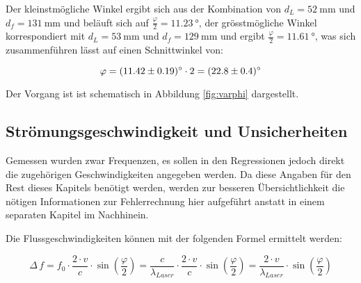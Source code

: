 Der kleinstm\"ogliche Winkel ergibt sich aus der Kombination von
$d_L = \SI{52}{\milli\meter}$
und
$d_f = \SI{131}{\milli\meter}$
und
bel\"auft sich auf
$\frac{\varphi}{2} = \SI{11.23}{\degree}$,
der gr\"osstm\"ogliche Winkel korrespondiert mit
$d_L = \SI{53}{\milli\meter}$
und
$d_f = \SI{129}{\milli\meter}$
und ergibt
$\frac{\varphi}{2} = \SI{11.61}{\degree}$,
was sich zusammenf\"uhren l\"asst auf einen Schnittwinkel von:

\begin{equation}
    \label{eq:varphi_result}
    \varphi = \SI{11.42 \pm 0.19}{\degree} \cdot 2 = \SI{22.8 \pm 0.4}{\degree}
\end{equation}

Der Vorgang ist ist schematisch in Abbildung \ref{fig:varphi} dargestellt.

\begin{minipage}[t]{\textwidth}
    \centering
    \resizebox{.67\textwidth}{!}{}
    \label{fig:varphi}
\end{minipage}

\clearpage
\subsection{Str\"omungsgeschwindigkeit und Unsicherheiten}
\label{subsec:vUncert}


Gemessen  wurden  zwar  Frequenzen,  es  sollen  in  den  Regressionen  jedoch
direkt die zugeh\"origen Geschwindigkeiten  angegeben werden. Da diese Angaben
f\"ur  den  Rest  dieses  Kapitels  ben\"otigt  werden,  werden  zur  besseren
\"Ubersichtlichkeit  die  n\"otigen   Informationen  zur  Fehlerrechnung  hier
aufgef\"uhrt anstatt in einem separaten Kapitel im Nachhinein.

Die Flussgeschwindigkeiten k\"onnen mit der folgenden Formel ermittelt werden:

\begin{equation}
        \label{eq:deltaF2}
        \Delta\,f = f_0 \cdot \frac{2 \cdot v}{c} \cdot \sin\left( \frac{\varphi}{2}\right)
                  = \frac{c}{\lambda_{Laser}} \cdot \frac{2 \cdot v}{c} \cdot \sin\left( \frac{\varphi}{2}\right)
                  = \frac{2 \cdot v}{\lambda_{Laser}} \cdot \sin\left( \frac{\varphi}{2}\right)
\end{equation}

